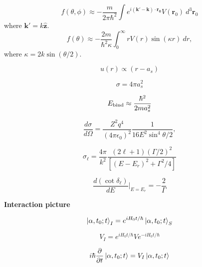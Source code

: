 \documentclass[11pt]{article}
\newcommand{\vect}[1]{\boldsymbol{\mathbf{#1}}}
\begin{document}
\begin{multicols}{2}
\begin{equation}
f(\theta,\phi) \approx - \frac{m}{2\pi\hbar^2}
                 \int e^{i(\vect{k'}-\vect{k}) \cdot \vect{r_0}} V(\vect{r}_0)
                      \: d^3 \vect{r}_0
\end{equation}
where $\vect{k'} = k \vect{\hat{z}}$.
\begin{equation}
f(\theta) \approx - \frac{2m}{\hbar^2 \kappa}
          \int_{0}^{\infty} r V(r) \sin(\kappa r) \: dr,
\end{equation}
where $\kappa = 2 k \sin(\theta/2)$.

\begin{equation}
u(r) \propto (r - a_s)
\end{equation}

\begin{equation}
\sigma = 4\pi a_s^2
\end{equation}

\begin{equation}
E_{\rm bind} \approx \frac{\hbar^2}{2ma_s^2}
\end{equation}

\begin{equation}
  \frac{d\sigma}{d\Omega} = \frac{Z^2 q^4}{(4\pi\epsilon_0)^2}
  \frac{1}{16E^2 \sin^4 \theta/2} ,
\end{equation}

\begin{equation}
  \sigma_{\ell} = \frac{4\pi}{k^2}
                  \frac{(2\ell+1)(\Gamma/2)^2}{[(E-E_r)^2+\Gamma^2/4]}
\end{equation}

\begin{equation}
\frac{d(\cot \delta_{\ell})}{dE} \bigg\rvert_{E=E_r} = - \frac{2}{\Gamma} 
\end{equation}


{\bf Interaction picture}

\begin{equation} %
\ket{\alpha,t_0;t}_{I} = 
  e^{iH_0t/\hbar} \ket{\alpha,t_0;t}_{S} 
\end{equation}

\begin{equation} %
V_I = e^{iH_0t/\hbar}Ve^{-iH_0t/\hbar}
\end{equation}

\begin{equation} %
i\hbar \frac{\partial}{\partial t} \ket{\alpha,t_0;t} = V_I \ket{\alpha,t_0;t}
\end{equation}


\end{multicols}
\end{document}
